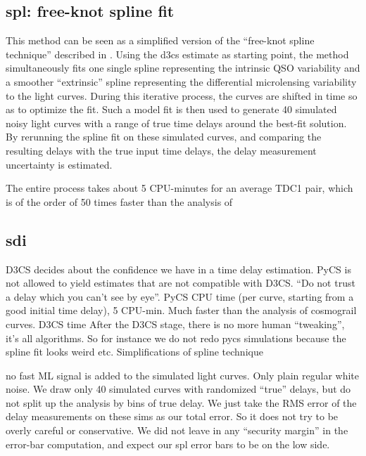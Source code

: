 \documentclass[traditabstract]{aa}
\begin{document}
\subsection{spl: free-knot spline fit}
This method can be seen as a simplified version of the ``free-knot spline technique'' described in \citet{pycs}. Using the d3cs estimate as starting point, the method simultaneously fits one single spline representing the intrinsic QSO variability and a smoother ``extrinsic'' spline representing the differential microlensing variability to the light curves. During this iterative process, the curves are shifted in time so as to optimize the fit. Such a model fit is then used to generate 40 simulated noisy light curves with a range of true time delays around the best-fit solution. By rerunning the spline fit on these simulated curves, and comparing the resulting delays with the true input time delays, the delay measurement uncertainty is estimated.



The entire process takes about 5 CPU-minutes for an average TDC1 pair, which is of the order of 50 times faster than the analysis of 



\subsection{sdi}


D3CS decides about the confidence we have in a time delay estimation. PyCS is not allowed to yield estimates that are not compatible with D3CS. “Do not trust a delay which you can't see by eye”.
PyCS CPU time (per curve, starting from a good initial time delay), 5 CPU-min. Much faster than the analysis of cosmograil curves.
D3CS time
After the D3CS stage, there is no more human “tweaking”, it's all algorithms. So for instance we do not redo pycs simulations because the spline fit looks weird etc.
Simplifications of spline technique

no fast ML signal is added to the simulated light curves. Only plain regular white noise.
We draw only 40 simulated curves with randomized “true” delays, but do not split up the analysis by bins of true delay. We just take the RMS error of the delay measurements on these sims as our total error.
So it does not try to be overly careful or conservative. We did not leave in any “security margin” in the error-bar computation, and expect our spl error bars to be on the low side.


\section{}
\end{document}
